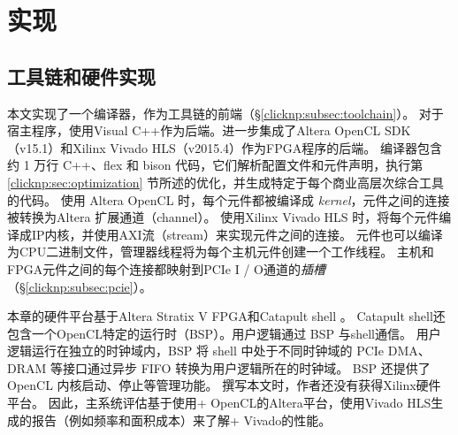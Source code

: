 \section{实现}
\label{clicknp:sec:impl}

\subsection{\name 工具链和硬件实现}

本文实现了一个\name 编译器，作为\name 工具链的前端（\S \ref {clicknp:subsec:toolchain}）。
对于宿主程序，使用Visual C++作为后端。进一步集成了Altera OpenCL SDK（v15.1）\cite {aoc}和Xilinx Vivado HLS（v2015.4）\cite {vivado}作为FPGA程序的后端。
\name 编译器包含约 1 万行 C++、flex 和 bison 代码，它们解析配置文件和元件声明，执行第 \ref {clicknp:sec:optimization} 节所述的优化，并生成特定于每个商业高层次综合工具的代码。
使用 Altera OpenCL 时，每个\name 元件都被编译成 \textit {kernel}，元件之间的连接被转换为Altera 扩展通道（channel）。
使用Xilinx Vivado HLS 时，将每个元件编译成IP内核，并使用AXI流（stream）来实现元件之间的连接。
元件也可以编译为CPU二进制文件，管理器线程将为每个主机元件创建一个工作线程。
主机和FPGA元件之间的每个连接都映射到PCIe I / O通道的\textit {插槽}（\S \ref {clicknp:subsec:pcie}）。


本章的硬件平台基于Altera Stratix V FPGA和Catapult shell \cite {putnam2014reconfigurable}。
Catapult shell还包含一个OpenCL特定的运行时（BSP）。\name 用户逻辑通过 BSP 与shell通信。
\name 用户逻辑运行在独立的时钟域内，BSP 将 shell 中处于不同时钟域的 PCIe DMA、DRAM 等接口通过异步 FIFO 转换为用户逻辑所在的时钟域。
BSP 还提供了 OpenCL 内核启动、停止等管理功能。
撰写本文时，作者还没有获得Xilinx硬件平台。
因此，主系统评估基于使用\name + OpenCL的Altera平台，使用Vivado HLS生成的报告（例如频率和面积成本）来了解\name + Vivado的性能。


